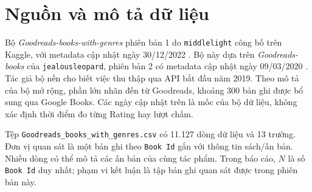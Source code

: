 \documentclass[11pt,a4paper]{article}
\newcommand{\Dataset}{\textit{Goodreads-books-with-genres}}
\begin{document}

\clearpage
\section{Nguồn và mô tả dữ liệu}
\label{sec:source}
Bộ \Dataset{} phiên bản 1 do \texttt{middlelight} công bố trên Kaggle, với metadata cập nhật ngày 30/12/2022 \cite{middlelight}. Bộ này dựa trên \textit{Goodreads-books} của \texttt{jealousleopard}, phiên bản 2 có metadata cập nhật ngày 09/03/2020 \cite{jealousleopard}. Tác giả bộ nền cho biết việc thu thập qua API bắt đầu năm 2019. Theo mô tả của bộ mở rộng, phần lớn nhãn đến từ Goodreads, khoảng 300 bản ghi được bổ sung qua Google Books. Các ngày cập nhật trên là mốc của bộ dữ liệu, không xác định thời điểm đo từng Rating hay lượt chấm.

Tệp \texttt{Goodreads\_books\_with\_genres.csv} có 11.127 dòng dữ liệu và 13 trường. Đơn vị quan sát là một bản ghi theo \texttt{Book Id} gắn với thông tin sách/ấn bản. Nhiều dòng có thể mô tả các ấn bản của cùng tác phẩm. Trong báo cáo, \(N\) là số \texttt{Book Id} duy nhất; phạm vi kết luận là tập bản ghi quan sát được trong phiên bản này.
\end{document}
